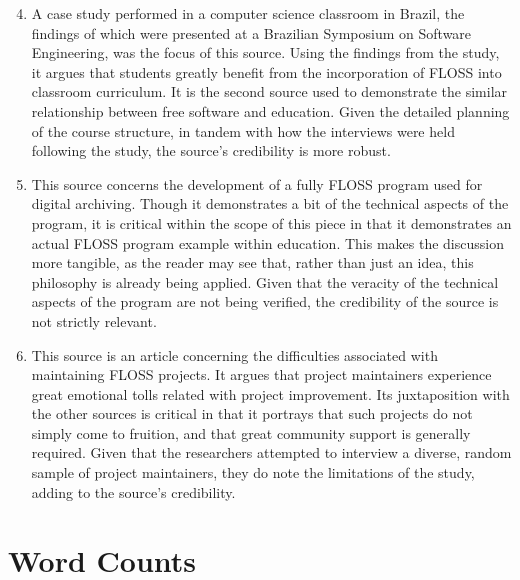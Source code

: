 \documentclass[conference]{IEEEtran}
\begin{document}
\vfill\newpage

\begin{enumerate}

    \setcounter{enumi}{3}

  \item A case study performed in a computer science classroom in Brazil, the findings of which were presented at a Brazilian Symposium on Software Engineering, was the focus of this source. Using the findings from the study, it argues that students greatly benefit from the incorporation of FLOSS into classroom curriculum. It is the second source used to demonstrate the similar relationship between free software and education. Given the detailed planning of the course structure, in tandem with how the interviews were held following the study, the source's credibility is more robust.

  \item This source concerns the development of a fully FLOSS program used for digital archiving. Though it demonstrates a bit of the technical aspects of the program, it is critical within the scope of this piece in that it demonstrates an actual FLOSS program example within education. This makes the discussion more tangible, as the reader may see that, rather than just an idea, this philosophy is already being applied. Given that the veracity of the technical aspects of the program are not being verified, the credibility of the source is not strictly relevant.

  \item This source is an article concerning the difficulties associated with maintaining FLOSS projects. It argues that project maintainers experience great emotional tolls related with project improvement. Its juxtaposition with the other sources is critical in that it portrays that such projects do not simply come to fruition, and that great community support is generally required. Given that the researchers attempted to interview a diverse, random sample of project maintainers, they do note the limitations of the study, adding to the source's credibility.

\end{enumerate}

\section{Word Counts}
\end{document}
